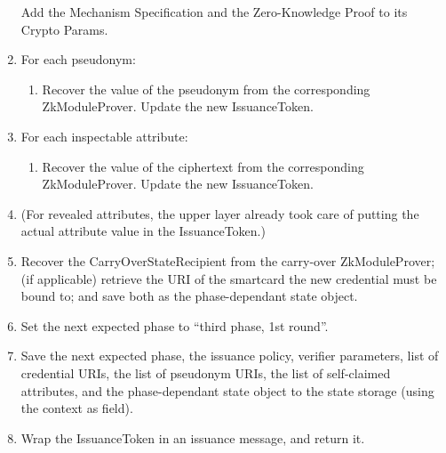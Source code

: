 \begin{enumerate}
        Add the Mechanism Specification and the Zero-Knowledge Proof to its Crypto Params.
      \item For each pseudonym:
        \begin{enumerate}
          \item Recover the value of the pseudonym from the corresponding ZkModuleProver. Update the new IssuanceToken.
        \end{enumerate}
      \item For each inspectable attribute:
        \begin{enumerate}
          \item Recover the value of the ciphertext from the corresponding ZkModuleProver. Update the new IssuanceToken.
        \end{enumerate}
      \item (For revealed attributes, the upper layer already took care of putting the actual attribute value in the IssuanceToken.)
      \item Recover the CarryOverStateRecipient from the carry-over ZkModuleProver; (if applicable) retrieve the URI of the smartcard the new credential
            must be bound to; and save both as the phase-dependant state object.
      \item Set the next expected phase to ``third phase, 1st round''.
      \item Save the next expected phase, the issuance policy, verifier parameters, list of credential URIs, the list of
        pseudonym URIs, the list of self-claimed attributes, and the phase-dependant state object to the state storage (using the context as field).
      \item Wrap the IssuanceToken in an issuance message, and return it.
    \end{enumerate}

